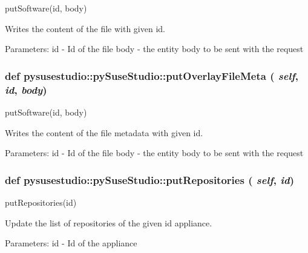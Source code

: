 \label{classpysusestudio_1_1py_suse_studio_aabf405f8c1c7b56b71a2d4911a3df813}
\begin{DoxyVerb}putSoftware(id, body)

        Writes the content of the file with given id.  
            
            Parameters:
id - Id of the file
body - the entity body to be sent with the request

\end{DoxyVerb}
 \hypertarget{classpysusestudio_1_1py_suse_studio_a0190fc73980adef1a17b4d096012a35c}{
\subsubsection[{putOverlayFileMeta}]{\setlength{\rightskip}{0pt plus 5cm}def pysusestudio::pySuseStudio::putOverlayFileMeta ( {\em self}, \/   {\em id}, \/   {\em body})}}
\label{classpysusestudio_1_1py_suse_studio_a0190fc73980adef1a17b4d096012a35c}
\begin{DoxyVerb}putSoftware(id, body)

        Writes the content of the file metadata with given id.  
            
            Parameters:
id - Id of the file
body - the entity body to be sent with the request

\end{DoxyVerb}
 \hypertarget{classpysusestudio_1_1py_suse_studio_af52249bbd81c55a5a1d4253ac28c9647}{
\subsubsection[{putRepositories}]{\setlength{\rightskip}{0pt plus 5cm}def pysusestudio::pySuseStudio::putRepositories ( {\em self}, \/   {\em id})}}
\label{classpysusestudio_1_1py_suse_studio_af52249bbd81c55a5a1d4253ac28c9647}
\begin{DoxyVerb}putRepositories(id)

        Update the list of repositories of the given id appliance.  
            
            Parameters:
id - Id of the appliance

\end{DoxyVerb}
